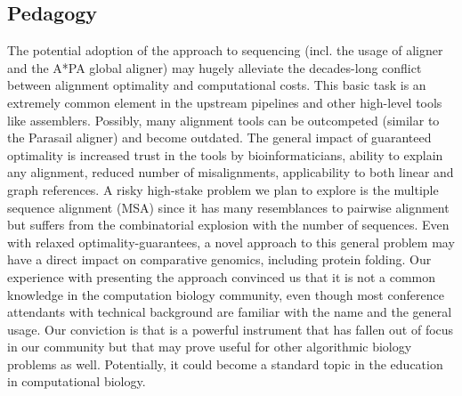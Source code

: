 \subsection*{Pedagogy}
The potential adoption of the \A approach to sequencing (incl. the usage of
\astarix aligner and the A*PA global aligner) may hugely alleviate the
decades-long conflict between alignment optimality and computational costs. This
basic task is an extremely common element in the upstream pipelines and other
high-level tools like assemblers. Possibly, many alignment tools can be
outcompeted (similar to the Parasail aligner) and become outdated. The general
impact of guaranteed optimality is increased trust in the tools by
bioinformaticians, ability to explain any alignment, reduced number of
misalignments, applicability to both linear and graph references. A risky
high-stake problem we plan to explore is the multiple sequence alignment (MSA)
since it has many resemblances to pairwise alignment but suffers from the
combinatorial explosion with the number of sequences. Even with relaxed
optimality-guarantees, a novel approach to this general problem may have a
direct impact on comparative genomics, including protein folding. Our experience
with presenting the \A approach convinced us that it is not a common knowledge
in the computation biology community, even though most conference attendants
with technical background are familiar with the name and the general usage. Our
conviction is that \A is a powerful instrument that has fallen out of focus in
our community but that may prove useful for other algorithmic biology problems
as well. Potentially, it could become a standard topic in the education in
computational biology.